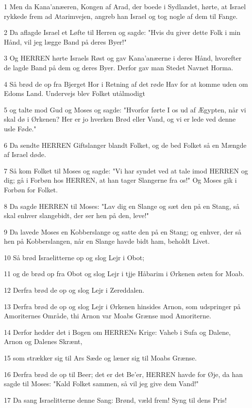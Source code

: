 \par 1 Men da Kana'anæeren, Kongen af Arad, der boede i Sydlandet, hørte, at Israel rykkede frem ad Atarimvejen, angreb han Israel og tog nogle af dem til Fange.
\par 2 Da aflagde Israel et Løfte til Herren og sagde: "Hvis du giver dette Folk i min Hånd, vil jeg lægge Band på deres Byer!"
\par 3 Og HERREN hørte Israels Røst og gav Kana'anæerne i deres Hånd, hvorefter de lagde Band på dem og deres Byer. Derfor gav man Stedet Navnet Horma.
\par 4 Så brød de op fra Bjerget Hor i Retning af det røde Hav for at komme uden om Edoms Land. Undervejs blev Folket utålmodigt
\par 5 og talte mod Gud og Moses og sagde: "Hvorfor førte I os ud af Ægypten, når vi skal dø i Ørkenen? Her er jo hverken Brød eller Vand, og vi er lede ved denne usle Føde."
\par 6 Da sendte HERREN Giftslanger blandt Folket, og de bed Folket så en Mængde af Israel døde.
\par 7 Så kom Folket til Moses og sagde: "Vi har syndet ved at tale imod HERREN og dig; gå i Forbøn hos HERREN, at han tager Slangerne fra os!" Og Moses gik i Forbøn for Folket.
\par 8 Da sagde HERREN til Moses: "Lav dig en Slange og sæt den på en Stang, så skal enhver slangebidt, der ser hen på den, leve!"
\par 9 Da lavede Moses en Kobberslange og satte den på en Stang; og enhver, der så hen på Kobberslangen, når en Slange havde bidt ham, beholdt Livet.
\par 10 Så brød Israelitterne op og slog Lejr i Obot;
\par 11 og de brød op fra Obot og slog Lejr i tjje Håbarim i Ørkenen østen for Moab.
\par 12 Derfra brød de op og slog Lejr i Zereddalen.
\par 13 Derfra brød de op og slog Lejr i Ørkenen hinsides Arnon, som udspringer på Amoriternes Område, thi Arnon var Moabs Grænse mod Amoriterne.
\par 14 Derfor hedder det i Bogen om HERRENs Krige: Vaheb i Sufa og Dalene, Arnon og Dalenes Skrænt,
\par 15 som strækker sig til Ars Sæde og læner sig til Moabs Grænse.
\par 16 Derfra brød de op til Beer; det er det Be'er, HERREN havde for Øje, da han sagde til Moses: "Kald Folket sammen, så vil jeg give dem Vand!"
\par 17 Da sang Israelitterne denne Sang: Brønd, væld frem! Syng til dens Pris!

